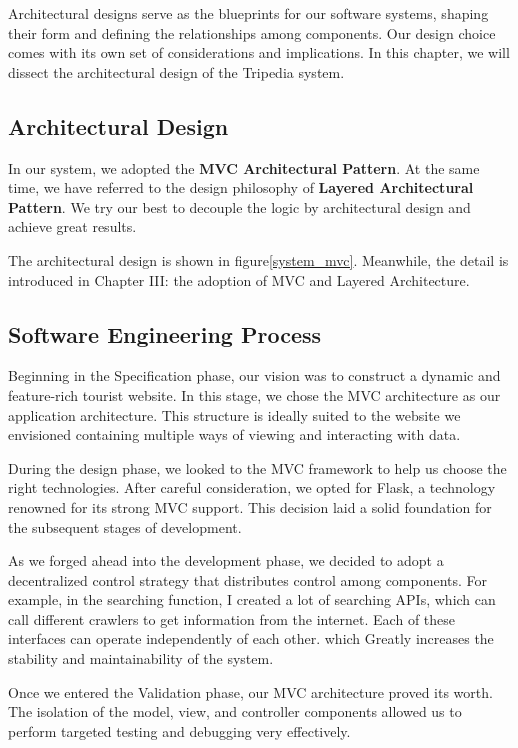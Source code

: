 \documentclass[conference]{IEEEtran}
\begin{document}
Architectural designs serve as the blueprints for our software systems, shaping their form and defining the relationships among components. Our design choice comes with its own set of considerations and implications. In this chapter, we will dissect the architectural design of the Tripedia system. 


\subsection{\textbf{Architectural Design}}

In our system, we adopted the \textbf{MVC Architectural Pattern}. At the same time, we have referred to the design philosophy of \textbf{Layered Architectural Pattern}. We try our best to decouple the logic by architectural design and achieve great results.

The architectural design is shown in figure\ref{system_mvc}. Meanwhile, the detail is introduced in Chapter III: the adoption of MVC and Layered Architecture.


\subsection{\textbf{Software Engineering Process}}

Beginning in the Specification phase, our vision was to construct a dynamic and feature-rich tourist website. In this stage, we chose the MVC architecture as our application architecture. This structure is ideally suited to the website we envisioned containing multiple ways of viewing and interacting with data.

During the design phase, we looked to the MVC framework to help us choose the right technologies. After careful consideration, we opted for Flask, a technology renowned for its strong MVC support. This decision laid a solid foundation for the subsequent stages of development.

As we forged ahead into the development phase, we decided to adopt a decentralized control strategy that distributes control among components. For example, in the searching function, I created a lot of searching APIs, which can call different crawlers to get information from the internet. Each of these interfaces can operate independently of each other. which Greatly increases the stability and maintainability of the system.

Once we entered the Validation phase, our MVC architecture proved its worth. The isolation of the model, view, and controller components allowed us to perform targeted testing and debugging very effectively.
\end{document}
